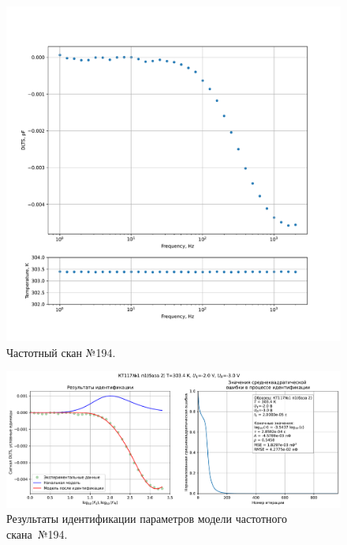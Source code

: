 \begin{figure}[!ht]
    \centering
    \includegraphics[width=1\textwidth]{../plots/КТ117№1_п1(база 2)_2500Гц-1Гц_1пФ_+30С_-2В-3В_50мВ_20мкс_шаг_0,1.pdf}
    \caption{Частотный скан №194.}
    \label{pic:frequency_scan_194}
\end{figure}

\begin{figure}[!ht]
    \centering
    \includegraphics[width=1\textwidth]{../plots/КТ117№1_п1(база 2)_2500Гц-1Гц_1пФ_+30С_-2В-3В_50мВ_20мкс_шаг_0,1_model.pdf}
    \caption{Результаты идентификации параметров модели частотного скана~№194.}
    \label{pic:frequency_scan_model194}
\end{figure}

\pagebreak


